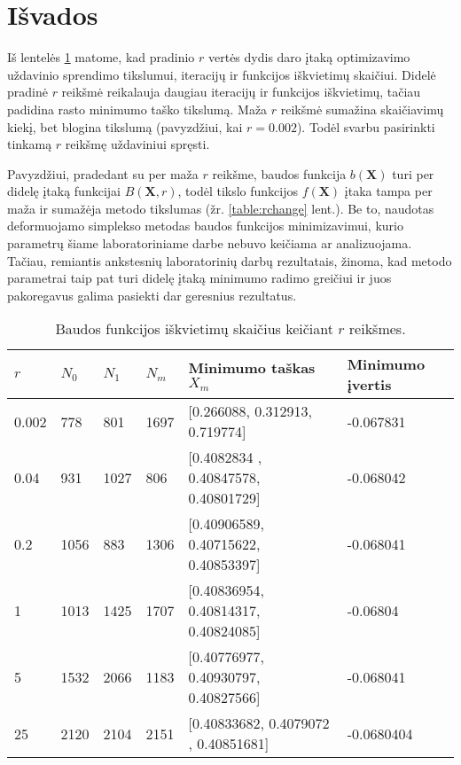 \documentclass[a4paper,12pt,fleqn]{article}
\begin{document}
\pagebreak
\section{Išvados}

Iš lentelės \ref{table:rcomparison} matome, kad pradinio $r$ vertės dydis daro įtaką optimizavimo uždavinio sprendimo tikslumui, iteracijų ir funkcijos iškvietimų skaičiui. Didelė pradinė $r$ reikšmė reikalauja daugiau iteracijų ir funkcijos iškvietimų, tačiau padidina rasto minimumo taško tikslumą. Maža $r$ reikšmė sumažina skaičiavimų kiekį, bet blogina tikslumą (pavyzdžiui, kai $r = 0.002$). Todėl svarbu pasirinkti tinkamą $r$ reikšmę uždaviniui spręsti.

Pavyzdžiui, pradedant su per maža $r$ reikšme, baudos funkcija $b(\mathbf{X})$ turi per didelę įtaką funkcijai $B(\mathbf{X}, r)$, todėl tikslo funkcijos $f(\mathbf{X})$ įtaka tampa per maža ir sumažėja metodo tikslumas (žr. \ref{table:rchange} lent.). Be to, naudotas deformuojamo simplekso metodas baudos funkcijos minimizavimui, kurio parametrų šiame laboratoriniame darbe nebuvo keičiama ar analizuojama. Tačiau, remiantis ankstesnių laboratorinių darbų rezultatais, žinoma, kad metodo parametrai taip pat turi didelę įtaką minimumo radimo greičiui ir juos pakoregavus galima pasiekti dar geresnius rezultatus.

\begin{table}[H]
\centering
\caption{Baudos funkcijos iškvietimų skaičius keičiant $r$ reikšmes.}
\def\arraystretch{1.2}
\setlength{\tabcolsep}{0.8em}
\begin{tabular}{l l l l l l}
\hline\hline
$r$ & $N_0$ & $N_1$ & $N_m$ & Minimumo taškas $X_m$ & Minimumo įvertis \\ [0.5ex]
\hline
0.002 & 778  & 801  & 1697 & [0.266088, 0.312913, 0.719774] & -0.067831 \\
0.04  & 931  & 1027 & 806  & [0.4082834 , 0.40847578, 0.40801729] & -0.068042 \\
0.2   & 1056 & 883  & 1306 & [0.40906589, 0.40715622, 0.40853397] & -0.068041 \\
1     & 1013 & 1425 & 1707 & [0.40836954, 0.40814317, 0.40824085]  & -0.06804 \\
5     & 1532 & 2066 & 1183 & [0.40776977, 0.40930797, 0.40827566] &  -0.068041 \\
25    & 2120 & 2104 & 2151 & [0.40833682, 0.4079072 , 0.40851681] & -0.0680404  \\
\hline
\end{tabular}
\label{table:rcomparison}
\end{table}
\end{document}
